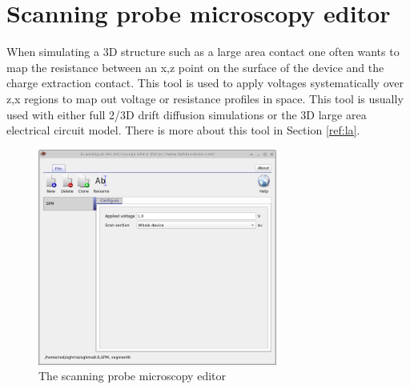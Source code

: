 \newpage
\section{Scanning probe microscopy editor}
When simulating a 3D structure such as a large area contact one often wants to map the resistance between an x,z point on the surface of the device and the charge extraction contact. This tool is used to apply voltages systematically over z,x regions to map out voltage or resistance profiles in space.  This tool is usually used with either full 2/3D drift diffusion simulations or the 3D large area electrical circuit model. There is more about this tool in Section \ref{ref:la}.

\begin{figure}[H]
\centering
\includegraphics[width=0.7\textwidth,height=0.5\textwidth]{./images/sim_editors/spm.png}
\caption{The scanning probe microscopy editor}
\label{fig:spm_editor}
\end{figure}
